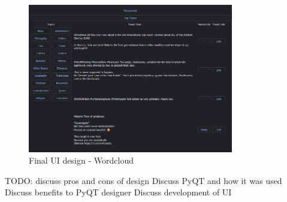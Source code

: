 \begin{figure}[h]
    \centering
    \includegraphics[width=0.8\textwidth]{../images/UI-dark-1-ft.png}
    \caption{Final UI design - Wordcloud}
    \label{fig:ui-findtopics}
\end{figure}

TODO: discuss pros and cons of design
Discuss PyQT and how it was used
Discuss benefits to PyQT designer
Discuss development of UI

